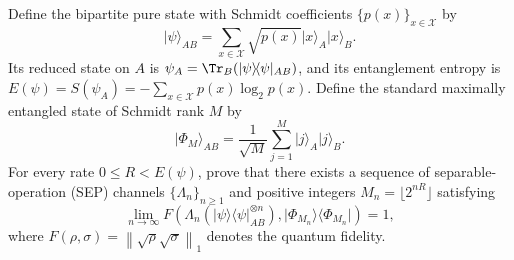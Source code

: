 Define the bipartite pure state with Schmidt coefficients $\{p(x)\}_{x\in\mathcal{X}}$ by
$$
\lvert \psi\rangle_{AB}=\sum_{x\in\mathcal{X}}\sqrt{p(x)}\lvert x\rangle_A\lvert x\rangle_B.
$$
Its reduced state on $A$ is $\psi_A=\Tr_B(\lvert\psi\rangle\!\langle\psi\rvert_{AB})$, and its entanglement entropy is $E(\psi)=S(\psi_A)=-\sum_{x\in\mathcal{X}}p(x)\log_2p(x).$
Define the standard maximally entangled state of Schmidt rank $M$ by
$$
\lvert \Phi_M\rangle_{AB}=\frac{1}{\sqrt M}\sum_{j=1}^{M}\lvert j\rangle_A\lvert j\rangle_B.
$$
For every rate $0\le R<E(\psi)$, prove that there exists a sequence of separable-operation (SEP) channels $\{\Lambda_n\}_{n\ge1}$ and positive integers $M_n=\lfloor 2^{nR}\rfloor$ satisfying
$$
\lim_{n\to\infty}F\!\left(
\Lambda_n\!\left(\lvert \psi\rangle\!\langle \psi\rvert_{AB}^{\otimes n}\right),
\lvert \Phi_{M_n}\rangle\!\langle \Phi_{M_n}\rvert
\right)=1,
$$
where $F(\rho,\sigma)=\left\lVert \sqrt\rho\sqrt\sigma\right\rVert_1$ denotes the quantum fidelity.

